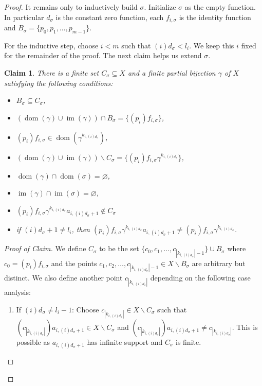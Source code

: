 \documentclass[11pt]{amsart}
\newtheorem*{claim}{Claim}
\newcommand{\im}{\operatorname{im}}
\newcommand{\dom}{\operatorname{dom}}
\begin{document}
\begin{proof}
     It remains only to inductively build \(\sigma\).
     Initialize \(\sigma\) as the empty function. In particular \(d_\sigma\) is the constant zero function, each \(f_{i,\sigma}\) is the identity function and \(B_{\sigma}=\{p_0,p_1,\ldots, p_{m-1}\}\).
     
     For the inductive step, choose \(i<m\) such that \((i)d_{\sigma}<l_i\). We keep this \(i\) fixed for the remainder of the proof. The next claim helps us extend \(\sigma\).
     \begin{claim}
         There is a finite set \(C_\sigma\subseteq X\) and a finite partial bijection \(\gamma\) of \(X\) satisfying the following conditions:
         \begin{itemize}
             \item \(B_\sigma\subseteq C_\sigma\), 
             \item \((\dom(\gamma)\cup \im(\gamma))\cap B_{\sigma}=\{(p_i)f_{i,\sigma}\}\),
             \item \((p_i)f_{i,\sigma}\in \dom(\gamma^{k_{i,(i)d_{\sigma}}})\), 
             \item \((\dom(\gamma)\cup \im(\gamma))\backslash C_\sigma=\{(p_i)f_{i,\sigma}\gamma^{k_{i,(i)d_{\sigma}}}\}\), 
             \item \(\dom(\gamma)\cap \dom(\sigma)=\varnothing\),
             \item  \(\im(\gamma)\cap \im(\sigma)=\varnothing\),
             \item \((p_i)f_{i,\sigma}\gamma^{k_{i,(i)d_{\sigma}}}a_{i, (i)d_{\sigma}+1}\notin C_\sigma\)
             \item if \((i)d_{\sigma}+1\neq l_i\), then \((p_i)f_{i,\sigma}\gamma^{k_{i,(i)d_{\sigma}}}a_{i, (i)d_{\sigma}+1}\neq  (p_i)f_{i,\sigma}\gamma^{k_{i,(i)d_{\sigma}}}\).
         \end{itemize} 
     \end{claim}
     \begin{proof}[Proof of Claim]
     We define \(C_\sigma\) to be the set \(\{c_0,c_1,\ldots, c_{|k_{i,(i)d_{\sigma}}|-1}\}\cup B_{\sigma}\) where \(c_0=(p_i)f_{i,\sigma}\) and the points \(c_1,c_2,\ldots,c_{|k_{i,(i)d_{\sigma}}|-1}\in X\backslash B_\sigma\) are arbitrary but distinct.
     We also define another point \(c_{|k_{i,(i)d_{\sigma}}|}\) depending on the following case analysis:
     \begin{enumerate}
         \item[(i)] If \((i)d_\sigma\neq l_i-1\): 
         Choose \(c_{|k_{i,(i)d_{\sigma}}|}\in X\backslash C_\sigma\) such that \((c_{|k_{i,(i)d_{\sigma}}|})a_{i,(i)d_{\sigma}+1}\in X\backslash C_\sigma\) and  \((c_{|k_{i,(i)d_{\sigma}}|})a_{i,(i)d_{\sigma}+1}\neq c_{|k_{i,(i)d_{\sigma}}|}\). This is possible as \(a_{i,(i)d_{\sigma}+1}\) has infinite support and \(C_\sigma\) is finite.
       

\end{enumerate}
\end{proof}
\end{proof}
\end{document}
